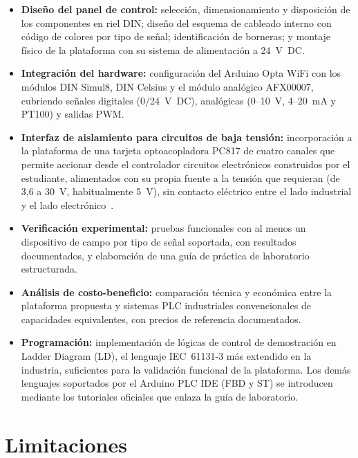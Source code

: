\documentclass[12pt,a4paper,oneside]{report}
\begin{document}
\begin{itemize}
    \item \textbf{Diseño del panel de control:} selección, dimensionamiento y disposición de los
    componentes en riel DIN; diseño del esquema de cableado interno con código de colores por tipo
    de señal; identificación de borneras; y montaje físico de la plataforma con su sistema de
    alimentación a 24~V~DC.

    \item \textbf{Integración del hardware:} configuración del Arduino Opta WiFi con los módulos
    DIN Simul8, DIN Celsius y el módulo analógico AFX00007, cubriendo señales digitales
    (0/24~V~DC), analógicas (0--10~V, 4--20~mA y PT100) y salidas PWM.

    \item \textbf{Interfaz de aislamiento para circuitos de baja tensión:} incorporación a la
    plataforma de una tarjeta optoacopladora PC817 de cuatro canales que permite accionar desde
    el controlador circuitos electrónicos construidos por el estudiante, alimentados con su propia
    fuente a la tensión que requieran (de 3,6 a 30~V, habitualmente 5~V), sin contacto eléctrico entre el lado industrial y el lado electrónico~\cite{ref13}.

    \item \textbf{Verificación experimental:} pruebas funcionales con al menos un dispositivo de
    campo por tipo de señal soportada, con resultados documentados, y elaboración de una guía de
    práctica de laboratorio estructurada.

    \item \textbf{Análisis de costo-beneficio:} comparación técnica y económica entre la
    plataforma propuesta y sistemas PLC industriales convencionales de capacidades equivalentes,
    con precios de referencia documentados.

    \item \textbf{Programación:} implementación de lógicas de control de demostración en Ladder
    Diagram (LD), el lenguaje IEC~61131-3 más extendido en la industria, suficientes para la
    validación funcional de la plataforma. Los demás lenguajes soportados por el Arduino PLC IDE
    (FBD y ST) se introducen mediante los tutoriales oficiales que enlaza la guía de laboratorio.
\end{itemize}

\section{Limitaciones}
\label{sec:limitaciones}
\end{document}
